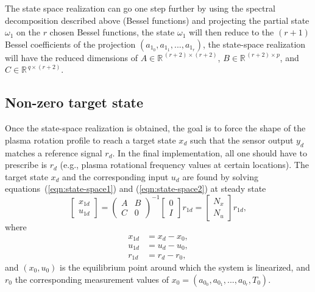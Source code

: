 \documentclass[12pt]{iopart}
\begin{document}
The state space realization can go one step further by using the spectral decomposition described above (Bessel functions) and projecting the partial state $ \omega_1$ on the $r$ chosen Bessel functions, the state $ \omega_1$ will then reduce to the $(r+1)$ Bessel coefficients of the projection $(a_{1_0}, a_{1_1}, ..., a_{1_r})$, the state-space realization will have the reduced dimensions of $A \in \mathbb{R}^{\, (r+2) \times (r+2)}$, $B \in \mathbb{R}^{\,(r+2) \times p}$, and $C \in \mathbb{R}^{\, q \times (r+2)}$.

\subsection{Non-zero target state}
Once the state-space realization is obtained, the goal is to force the shape of the plasma rotation profile to reach a target state $x_d$ such that the sensor output $y_d$ matches a reference signal $r_d$. In the final implementation, all one should have to prescribe is $r_d$ (e.g., plasma rotational frequency values at certain locations). The target state $x_d$ and the corresponding input $u_d$ are found by solving equations~(\ref{eqn:state-space1}) and (\ref{eqn:state-space2}) at steady state
\begin{equation}
\left[\! \begin{array}{c}  x_{1d} \\ u_{1d}\end{array}\!\right]
  ={ \left(\! \begin{array}{cc} A  & B \\ C & 0 \end{array} \! \right)}^{-1} \left[\! \begin{array}{c} 0 \\ I    \end{array}  \!\right] r_{1d} = \left[\! \begin{array}{c} N_x \\ N_u    \end{array}  \!\right] r_{1d},
\label{steadystate}
\end{equation}
where 
\begin{eqnarray}
 x_{1d}  &= x_d - x_0, \\
 u_{1d}  &= u_d - u_0, \\
 r_{1d}  &= r_d - r_0 ,
\end{eqnarray}
and $\left( x_0, u_0  \right)$ is the equilibrium point around which the system is linearized, and $r_0$ the corresponding measurement values of $x_0 = \left( a_{0_0},a_{0_1}, ... , a_{0_r} ,  T_0 \right)$. 
 
\end{document}
